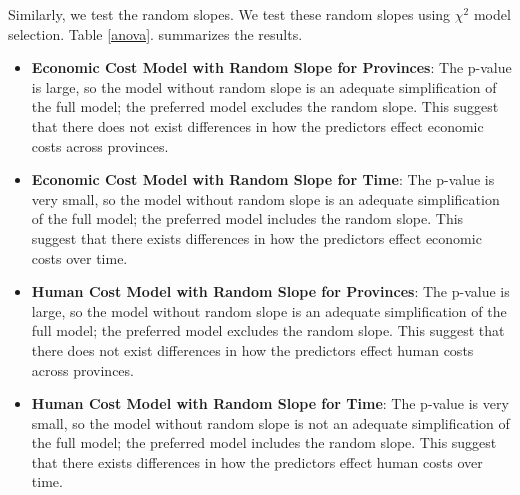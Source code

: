 Similarly, we test the random slopes. We test these random slopes using $\chi^2$ model selection. Table \ref{anova}. summarizes the results.
\begin{itemize}
	\item \textbf{Economic Cost Model with Random Slope for Provinces}: The p-value is large, so the model without random slope is an adequate simplification of the full model; the preferred model excludes the random slope. 
	This suggest that there does not exist differences in how the predictors effect economic costs across provinces.
	\item \textbf{Economic Cost Model with Random Slope for Time}: The p-value is very small, so the model without random slope is an adequate simplification of the full model; the preferred model includes the random slope. 
	This suggest that there exists differences in how the predictors effect economic costs over time.
	\item \textbf{Human Cost Model with Random Slope for Provinces}: The p-value is large, so the model without random slope is an adequate simplification of the full model; the preferred model excludes the random slope. 
	This suggest that there does not exist differences in how the predictors effect human costs across provinces.
	\item \textbf{Human Cost Model with Random Slope for Time}: The p-value is very small, so the model without random slope is not an adequate simplification of the full model; the preferred model includes the random slope. This suggest that there exists differences in how the predictors effect human costs over time.
\end{itemize}



